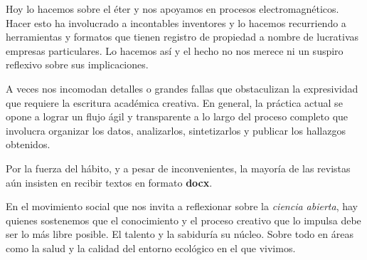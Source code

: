 \documentclass[
  letterpaper,
  DIV=11,
  numbers=noendperiod]{scrartcl}
\begin{document}
Hoy lo hacemos sobre el éter y nos apoyamos en procesos
electromagnéticos. Hacer esto ha involucrado a incontables inventores y
lo hacemos recurriendo a herramientas y formatos que tienen registro de
propiedad a nombre de lucrativas empresas particulares. Lo hacemos así y
el hecho no nos merece ni un suspiro reflexivo sobre sus implicaciones.

A veces nos incomodan detalles o grandes fallas que obstaculizan la
expresividad que requiere la escritura académica creativa. En general,
la práctica actual se opone a lograr un flujo ágil y transparente a lo
largo del proceso completo que involucra organizar los datos,
analizarlos, sintetizarlos y publicar los hallazgos obtenidos.

Por la fuerza del hábito, y a pesar de inconvenientes, la mayoría de las
revistas aún insisten en recibir textos en formato \textbf{docx}.

En el movimiento social que nos invita a reflexionar sobre la
\emph{ciencia abierta}, hay quienes sostenemos que el conocimiento y el
proceso creativo que lo impulsa debe ser lo más libre posible. El
talento y la sabiduría su núcleo. Sobre todo en áreas como la salud y la
calidad del entorno ecológico en el que vivimos.
\end{document}
